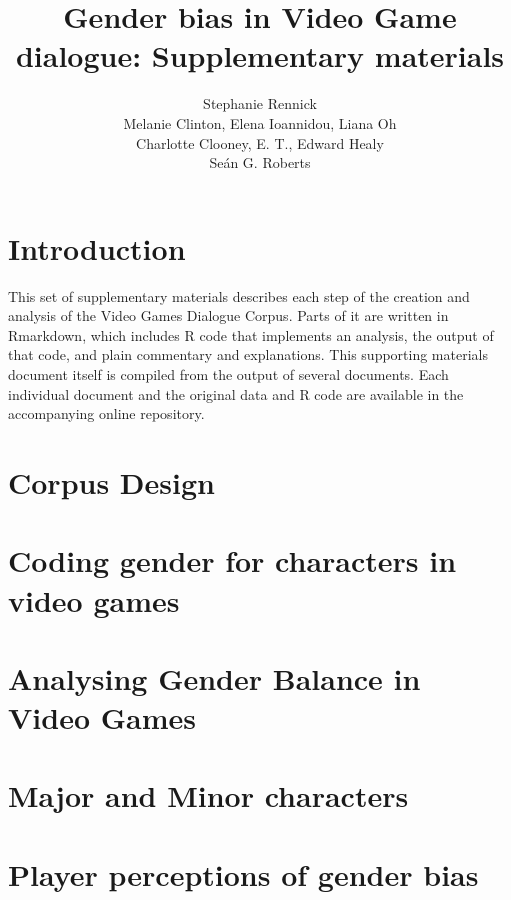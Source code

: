 \documentclass[12pt,a4paper]{article}
\author{Stephanie Rennick \\ Melanie Clinton, Elena Ioannidou, Liana Oh\\Charlotte Clooney, E. T., Edward Healy \\ Se\'{a}n G. Roberts}
\title{Gender bias in Video Game dialogue: Supplementary materials}
\newcommand{\includepdfPlus}[1]{}
\begin{document}
\maketitle
\tableofcontents

\clearpage
\newpage

\section{Introduction}

This set of supplementary materials describes each step of the creation and analysis of the Video Games Dialogue Corpus. Parts of it are written in Rmarkdown, which includes R code that implements an analysis, the output of that code, and plain commentary and explanations. This supporting materials document itself is compiled from the output of several documents. Each individual document and the original data and R code are available in the accompanying online repository.

\clearpage
\newpage
\section{Corpus Design}

\includepdfPlus{../../writeup/CorpusDescription.pdf}

\clearpage
\newpage

\section{Coding gender for characters in video games}

\includepdfPlus{../../writeup/CodingScheme.pdf}

\clearpage
\newpage

\section{Analysing Gender Balance in Video Games}

\includepdfPlus{../../analysis/Analyse_WordsPerGender.pdf}

\clearpage
\newpage
\section{Major and Minor characters}

\includepdfPlus{../../analysis/Analyse_MajorVsMinorCharacters.pdf}

\clearpage
\newpage
\section{Player perceptions of gender bias}
\end{document}
